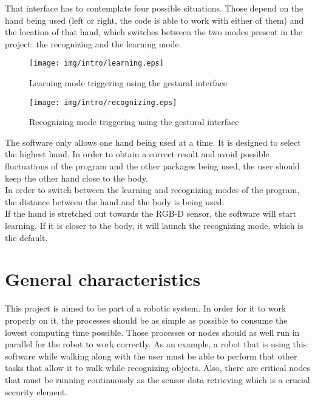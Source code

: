 That interface has to contemplate four possible situations. Those depend on the hand being used (left or right, the code is able to work with either of them) and the location of that hand, which switches between the two modes present in the project: the recognizing and the learning mode. 

\begin{wrapfigure}{l}{0.5\textwidth}
	\centering
    \texttt{[image: img/intro/learning.eps]}
	\caption[Learning Mode Triggering]{Learning mode triggering using the gestural interface}
\end{wrapfigure}


\begin{wrapfigure}{r}{0.5\textwidth}
	\centering
    \texttt{[image: img/intro/recognizing.eps]}
	\caption[Recognizing Mode Triggering]{Recognizing mode triggering using the gestural interface}
\end{wrapfigure}

The software only allows one hand being used at a time. It is designed to select the highest hand. In order to obtain a correct result and avoid possible fluctuations of the program and the other packages being used, the user should keep the other hand close to the body. 
\\


In order to switch between the learning and recognizing modes of the program, the distance between the hand and the body
is being used: 
\\

If the hand is stretched out towards the RGB-D sensor, the software will start learning. If it is closer to the body, 
it will launch the recognizing mode, which is the default. 







\section{General characteristics}
This project is aimed to be part of a robotic system. In order for it to work properly on it, the processes should be as simple as possible to consume the lowest computing time possible. Those processes or nodes should as well run in parallel for the robot to work correctly. As an example, a robot that is using this software while walking along with the user must be able to perform that other tasks that allow it to walk while recognizing objects. Also, there are critical nodes that must be running continuously as the sensor data retrieving which is a crucial security element. 
\\

